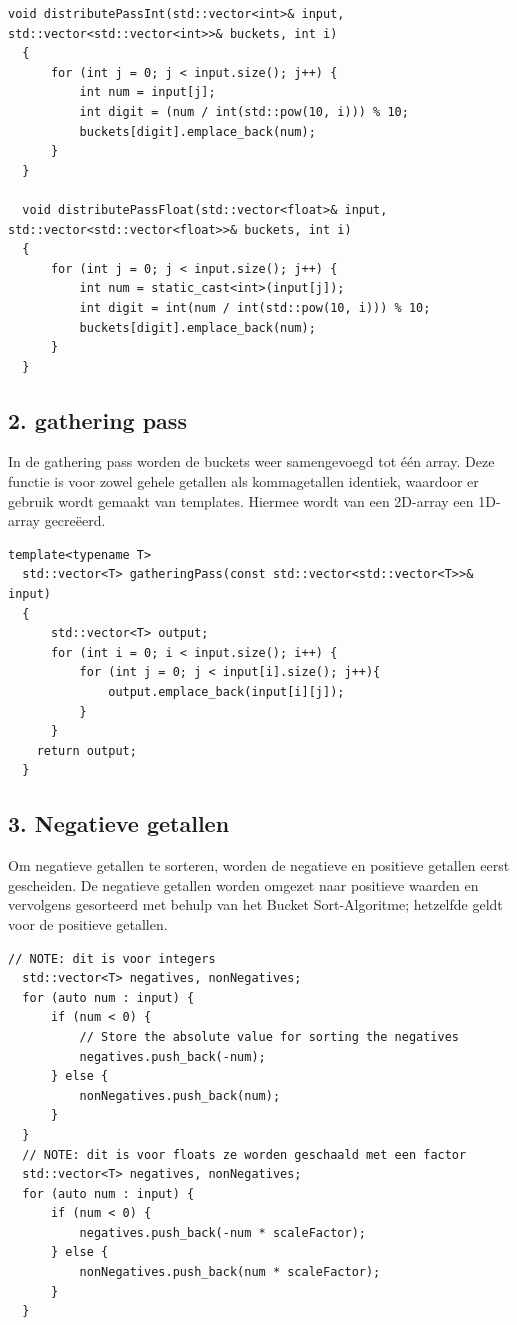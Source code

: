 \documentclass{article}
\begin{document}
\begin{lstlisting}[caption={Distribution pass}, label={lst:distribution}]
  void distributePassInt(std::vector<int>& input, std::vector<std::vector<int>>& buckets, int i)
  {
      for (int j = 0; j < input.size(); j++) {
          int num = input[j];
          int digit = (num / int(std::pow(10, i))) % 10;
          buckets[digit].emplace_back(num);
      }
  }

  void distributePassFloat(std::vector<float>& input, std::vector<std::vector<float>>& buckets, int i)
  {
      for (int j = 0; j < input.size(); j++) {
          int num = static_cast<int>(input[j]);
          int digit = int(num / int(std::pow(10, i))) % 10;
          buckets[digit].emplace_back(num);
      }
  }
\end{lstlisting}
\subsection{2. gathering pass}
In de gathering pass worden de buckets weer samengevoegd tot één array. Deze functie is voor zowel gehele getallen als kommagetallen identiek, 
waardoor er gebruik wordt gemaakt van templates. Hiermee wordt van een 2D-array een 1D-array gecreëerd.

\newpage
\begin{lstlisting}[caption={Gathering pass}, label={lst:gathering}]
  template<typename T>
  std::vector<T> gatheringPass(const std::vector<std::vector<T>>& input)
  {       
      std::vector<T> output;
      for (int i = 0; i < input.size(); i++) {
          for (int j = 0; j < input[i].size(); j++){
              output.emplace_back(input[i][j]);
          }
      }
    return output;
  }
\end{lstlisting}
\subsection{3. Negatieve getallen}
Om negatieve getallen te sorteren, worden de negatieve en positieve getallen eerst gescheiden.  
De negatieve getallen worden omgezet naar positieve waarden en vervolgens gesorteerd met behulp van het Bucket Sort-Algoritme; 
hetzelfde geldt voor de positieve getallen.
\begin{lstlisting}[caption={Negatieve getallen}, label={lst:negatives}]
  // NOTE: dit is voor integers
  std::vector<T> negatives, nonNegatives;
  for (auto num : input) {
      if (num < 0) {
          // Store the absolute value for sorting the negatives
          negatives.push_back(-num);
      } else {
          nonNegatives.push_back(num);
      }
  }
  // NOTE: dit is voor floats ze worden geschaald met een factor
  std::vector<T> negatives, nonNegatives;
  for (auto num : input) {
      if (num < 0) {
          negatives.push_back(-num * scaleFactor);
      } else {
          nonNegatives.push_back(num * scaleFactor);
      }
  }
\end{lstlisting}
\end{document}
